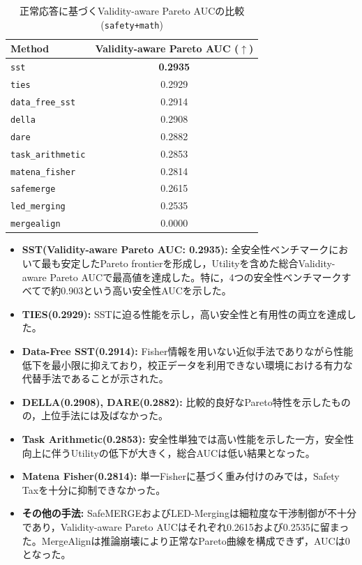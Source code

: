 \documentclass{article}
\begin{document}
\begin{table}[H]
\centering
\caption{正常応答に基づくValidity-aware Pareto AUCの比較(\texttt{safety+math})}
\label{tab:pareto_auc}
\small
\begin{tabular}{lc}
\toprule
\textbf{Method} & \textbf{Validity-aware Pareto AUC ($\uparrow$)} \\
\midrule
\texttt{sst} & \textbf{0.2935} \\
\texttt{ties} & 0.2929 \\
\texttt{data\_free\_sst} & 0.2914 \\
\texttt{della} & 0.2908 \\
\texttt{dare} & 0.2882 \\
\texttt{task\_arithmetic} & 0.2853 \\
\texttt{matena\_fisher} & 0.2814 \\
\texttt{safemerge} & 0.2615 \\
\texttt{led\_merging} & 0.2535 \\
\texttt{mergealign} & 0.0000 \\
\bottomrule
\end{tabular}
\end{table}

\begin{itemize}
    \item \textbf{SST(Validity-aware Pareto AUC: 0.2935):}
    全安全性ベンチマークにおいて最も安定したPareto frontierを形成し，Utilityを含めた総合Validity-aware Pareto AUCで最高値を達成した。特に，4つの安全性ベンチマークすべてで約0.903という高い安全性AUCを示した。
    \item \textbf{TIES(0.2929):}
    SSTに迫る性能を示し，高い安全性と有用性の両立を達成した。
    \item \textbf{Data-Free SST(0.2914):}
    Fisher情報を用いない近似手法でありながら性能低下を最小限に抑えており，校正データを利用できない環境における有力な代替手法であることが示された。
    \item \textbf{DELLA(0.2908), DARE(0.2882):}
    比較的良好なPareto特性を示したものの，上位手法には及ばなかった。
    \item \textbf{Task Arithmetic(0.2853):}
    安全性単独では高い性能を示した一方，安全性向上に伴うUtilityの低下が大きく，総合AUCは低い結果となった。
    \item \textbf{Matena Fisher(0.2814):}
    単一Fisherに基づく重み付けのみでは，Safety Taxを十分に抑制できなかった。
    \item \textbf{その他の手法:}
    SafeMERGEおよびLED-Mergingは細粒度な干渉制御が不十分であり，Validity-aware Pareto AUCはそれぞれ0.2615および0.2535に留まった。MergeAlignは推論崩壊により正常なPareto曲線を構成できず，AUCは0となった。
\end{itemize}
\end{document}
